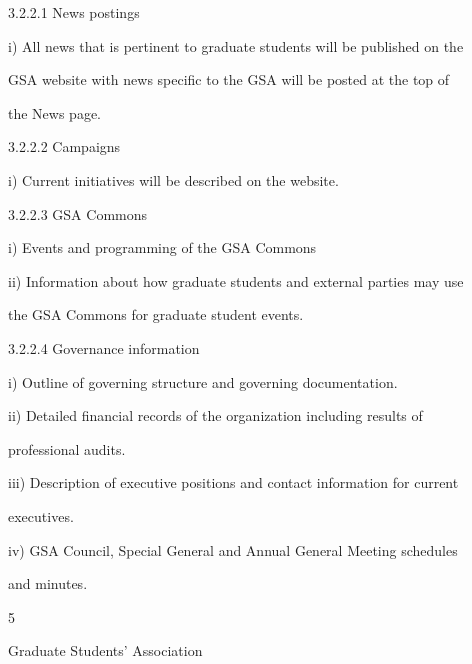   

3.2.2.1            News postings  

  

     i)       All news that is pertinent to graduate students will be published on the  

              GSA website with news specific to the GSA will be posted at the top of  

              the News page.   

  

3.2.2.2            Campaigns  

  

     i)       Current initiatives will be described on the website.  

  

3.2.2.3            GSA Commons  

  

     i)       Events and programming of the GSA Commons   

  

     ii)      Information  about  how  graduate  students  and  external  parties  may  use  

              the GSA Commons for graduate student events.   

  

3.2.2.4            Governance information   

  

     i)       Outline of governing structure and governing documentation.   

  

     ii)      Detailed   financial   records   of   the   organization   including   results   of  

              professional audits.   

  

     iii)     Description  of  executive  positions  and  contact  information  for  current  

              executives.   

  

     iv)      GSA  Council,  Special  General  and  Annual  General  Meeting schedules  

              and minutes.   

                                                        5  

                                       

                                     Graduate Students’ Association  

